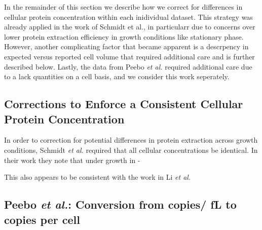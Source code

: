 \documentclass[11pt]{article}
\begin{document}
In the remainder of this section we describe how we correct for differences in
cellular protein concentration within each inidividual dataset. This  strategy
was already applied in the work of Schmidt et al., in particularr due to
concerns  over lower protein extraction efficiency in growth conditions like
stationary phase.  However, another complicating factor that became apparent is
a descrpency in expected versus reported cell volume that required additional
care and is further described below. Lastly, the  data from Peebo {\it et al.}
required additional care due to a lack quantities on a cell basis, and we
consider this work seperately.


\subsection{Corrections to Enforce a Consistent Cellular Protein Concentration}

In order to correction for potential differences in protein extraction across
growth conditions, Schmidt {\it et al.} required that all cellular concentrations
be identical. In their  work they note that under growth in -

This also appears to be consistent with the work in Li {\it et al.}



\subsection{Peebo {\it et al.}: Conversion from copies/ fL to copies per cell}


%
\end{document}
